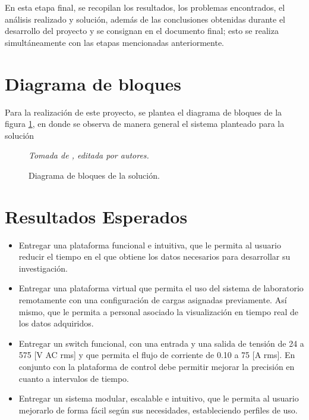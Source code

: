 En esta etapa final, se recopilan los resultados, los problemas encontrados, el análisis realizado y solución, además de las conclusiones obtenidas durante el desarrollo del proyecto y se consignan en el documento final; esto se realiza simultáneamente con las etapas mencionadas anteriormente.

\section{Diagrama de bloques}

Para la realización de este proyecto, se plantea el diagrama de bloques de la figura \ref{fig:bloques}, en donde se observa de manera general el sistema planteado para la solución

\begin{figure}[ht!]
\begin{centering}
\caption{\label{fig:bloques}Diagrama de bloques de la solución.}
\textit{Tomada de \cite{Proto}, editada por autores.} 
\par\end{centering}
\end{figure}

\section{Resultados Esperados}

\begin{itemize}
\item Entregar una plataforma funcional e intuitiva, que le permita al usuario reducir el tiempo en el que obtiene los datos necesarios para desarrollar su investigación.    

\item Entregar una plataforma virtual que permita el uso del sistema de laboratorio remotamente con una configuración de cargas asignadas previamente. Así mismo, que le permita a personal asociado la visualización en tiempo real de los datos adquiridos. 

\item Entregar un switch funcional, con una entrada y una salida de tensión de 24 a 575 [V AC rms] y que permita el flujo de corriente de 0.10 a 75 [A rms]. En conjunto con la plataforma de control debe permitir mejorar la precisión en cuanto a intervalos de tiempo.

\item Entregar un sistema modular, escalable e intuitivo, que le permita al usuario mejorarlo de forma fácil según sus necesidades, estableciendo perfiles de uso.

\end{itemize}

